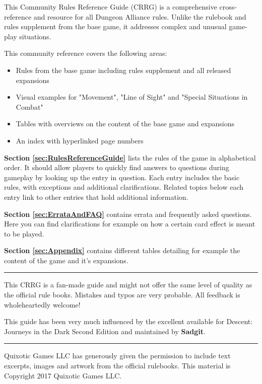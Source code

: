This Community Rules Reference Guide (CRRG) is a comprehensive cross-reference and resource for all Dungeon Alliance rules. Unlike the rulebook and rules supplement from the base game, it addresses complex and unusual game-play situations.

This community reference covers the following areas:
\begin{itemize}
\item Rules from the base game including rules supplement and all released expansions
\item Visual examples for "Movement", "Line of Sight" and "Special
Situations in Combat"
\item Tables with overviews on the content of the base game and expansions
\item An index with hyperlinked page numbers
\end{itemize}

\textbf{Section \ref*{sec:RulesReferenceGuide}} lists the rules of the game in alphabetical order. It should allow players to quickly find answers to questions during gameplay by looking up the entry in question. Each entry includes the basic rules, with exceptions and additional clarifications. Related topics below each entry link to other entries that hold additional information.

\textbf{Section \ref*{sec:ErrataAndFAQ}} contains errata and frequently asked questions. Here you can find clarifications for example on how a certain card effect is meant to be played.

\textbf{Section \ref*{sec:Appendix}} contains different tables detailing for example the content of the game and it's expansions.

\noindent\hfil\rule{2cm}{.2pt}\hfil

This CRRG is a fan-made guide and might not offer the same level of quality as the official rule books. Mistakes and typos are very probable. All feedback is wholeheartedly welcome!

This guide has been very much influenced by the excellent  available for Descent: Journeys in the Dark Second Edition and maintained by \textbf{Sadgit}.

\noindent\hfil\rule{2cm}{.2pt}\hfil

Quixotic Games LLC has generously given the permission to include text excerpts, images and artwork from the official rulebooks. This material is Copyright 2017 Quixotic Games LLC.